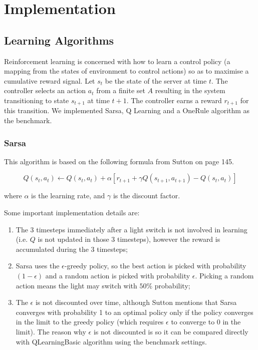 \section{Implementation}

\subsection{Learning Algorithms}

Reinforcement learning is concerned with how to learn a control policy (a
mapping from the states of environment to control actions) so as to maximise a
cumulative reward signal. Let $s_t$ be the state of the server at time $t$. The
controller selects an action $a_t$ from a finite set $A$ resulting in the system
transitioning to state $s_{t+1}$ at time $t+1$. The controller earns a reward
$r_{t+1}$ for this transition. We implemented Sarsa, Q Learning and a OneRule
algorithm as the benchmark.

\subsubsection{Sarsa}

This algorithm is based on the following formula from Sutton \cite{sutton_rl_1998} on page
145.

\begin{equation}
Q(s_{t},a_{t})\leftarrow Q(s_{t},a_{t}) + \alpha [ r_{t+1}+\gamma Q(s_{t+1},a_{t+1}) - Q(s_{t},a_{t}) ]
\end{equation}

where $\alpha $ is the learning rate, and $\gamma $ is the discount factor.

Some important implementation details are:

\begin{enumerate}
\item The 3 timesteps immediately
after a light switch is not involved in learning (i.e. $Q$ is not
updated in those 3 timesteps), however the reward is accumulated
during the 3 timesteps;

\item Sarsa uses the $\epsilon $-greedy policy, so
the best action is picked with probability $(1-\epsilon )$ and a
random action is picked with probability $\epsilon $. Picking
a random action means the light may switch with $50\%$ probability;

\item The $\epsilon $ is not discounted over time, although Sutton \cite{sutton_rl_1998}
mentions that Sarsa converges with probability 1 to an optimal policy
only if the policy converges in the limit to the greedy policy (which
requires $\epsilon $ to converge to 0 in the limit). The reason why
$\epsilon $ is not discounted is so it can be compared directly with
QLearningBasic algorithm using the benchmark settings.

\end{enumerate}

